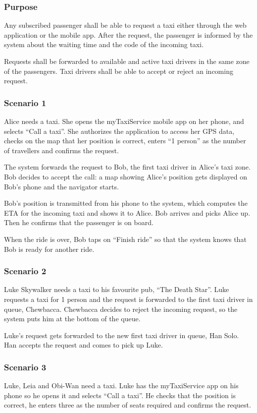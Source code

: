 \label{standard-call}
\subsubsection{Purpose}

Any subscribed passenger shall be able to request a taxi either through the web application or the mobile app.
After the request, the passenger is informed by the system about the waiting time and the code of the incoming taxi.

Requests shall be forwarded to available and active taxi drivers in the same zone of the passengers. Taxi drivers shall be able to accept or reject an incoming request.

\subsubsection{Scenario 1}
Alice needs a taxi. She opens the myTaxiService mobile app on her phone, and selects ``Call a taxi''. She authorizes the application to access her GPS data, checks on the map that her position is correct, enters ``1 person'' as the number of travellers and confirms the request.

The system forwards the request to Bob, the first taxi driver in Alice's taxi zone. Bob decides to accept the call: a map showing Alice's position gets displayed on Bob's phone and the navigator starts.

Bob's position is transmitted from his phone to the system, which computes the ETA for the incoming taxi and shows it to Alice. Bob arrives and picks Alice up. Then he confirms that the passenger is on board.

When the ride is over, Bob taps on ``Finish ride'' so that the system knows that Bob is ready for another ride.

\subsubsection{Scenario 2}
Luke Skywalker needs a taxi to his favourite pub, ``The Death Star''.
Luke requests a taxi for 1 person and the request is forwarded to the first taxi driver in queue, Chewbacca. Chewbacca decides to reject the incoming request, so the system puts him at the bottom of the queue.

Luke's request gets forwarded to the new first taxi driver in queue, Han Solo. Han accepts the request and comes to pick up Luke.

\subsubsection{Scenario 3}
Luke, Leia and Obi-Wan need a taxi. Luke has the myTaxiService app on his phone so he opens it and selects ``Call a taxi''. He checks that the position is correct, he enters three as the number of seats required and confirms the request.

